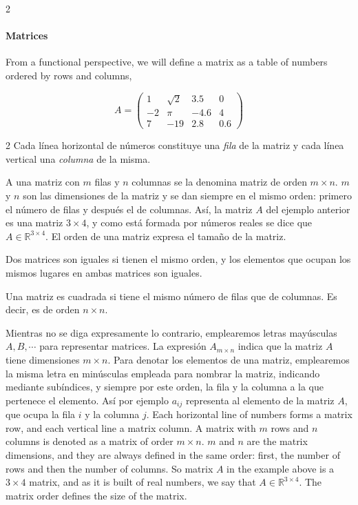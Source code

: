 \begin{paracol}{2}
\paragraph{Matrices} From a functional perspective, we will define a matrix as a table of numbers ordered by rows and columns,
\end{paracol}

\begin{equation*}
A=
\begin{pmatrix}
1& \sqrt{2}& 3.5& 0\\
-2& \pi& -4.6& 4\\
7& -19& 2.8& 0.6
\end{pmatrix}
\end{equation*}

\begin{paracol}{2}
Cada línea horizontal de números constituye una \emph{fila} de la matriz y cada línea vertical una \emph{columna} de la misma.

A una matriz con $m$ filas y $n$ columnas se la denomina matriz de orden $m\times n$. $m$ y $n$ son las dimensiones de la matriz y se dan siempre en el mismo orden: primero el número de filas y después el de columnas. Así, la matriz $A$ del ejemplo anterior es una matriz $3\times 4$, y como está formada por números reales se dice que $A\in\mathbb{R}^{3\times 4}$. El orden de una matriz expresa el tamaño de la matriz.

Dos matrices son iguales si tienen el mismo orden, y los elementos que ocupan los mismos lugares en ambas matrices son iguales.

Una matriz es cuadrada si tiene el mismo número de filas que de columnas. Es decir, es de orden $n\times n$.

Mientras no se diga expresamente lo contrario, emplearemos letras mayúsculas $A, B, \cdots$ para representar matrices. La expresión $A_{m\times n}$ indica que la matriz $A$ tiene dimensiones $m \times n$. Para denotar los elementos de una matriz, emplearemos la misma letra en minúsculas empleada para nombrar la matriz, indicando mediante subíndices, y siempre por este orden, la fila y la columna a la que pertenece el elemento. Así por ejemplo $a_{ij}$ representa al elemento de la matriz $A$, que ocupa la fila $i$ y la columna $j$.
\switchcolumn
Each horizontal line of numbers forms a matrix row, and each vertical line a matrix column.
A matrix with $m$ rows and $n$ columns is denoted as a matrix of order $m\times n$. $m$ and $n$ are the matrix dimensions, and they are always defined in the same order: first, the number of rows and then the number of columns. So matrix $A$ in the example above is a $3\times 4$ matrix, and as it is built of real numbers, we say that $A\in \mathbb{R}^{3\times 4}$. The matrix order defines the size of the matrix.


\end{paracol}
